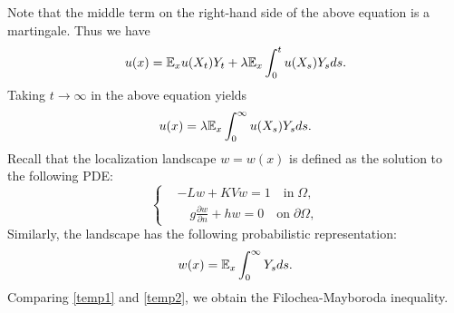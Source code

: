 \documentclass[a4paper,11pt]{article}
\begin{document}
\begin{appendices}
\begin{equation*}
\end{equation*}
Note that the middle term on the right-hand side of the above equation is a martingale. Thus we have
\begin{equation*}
u(x) = \mathbb{E}_xu(X_t)Y_t+\lambda\mathbb{E}_x\int_0^t u(X_s)Y_sds.
\end{equation*}
Taking $t\rightarrow\infty$ in the above equation yields
\begin{equation}\label{temp1}
u(x) = \lambda\mathbb{E}_x\int_0^\infty u(X_s)Y_sds.
\end{equation}
Recall that the localization landscape $w = w(x)$ is defined as the solution to the following PDE:
\begin{equation*}
\left\{
\begin{split}
& - L w + K V w = 1 \quad \textrm{in} \; \Omega, \\
& \quad g \frac{\partial w}{\partial n} + h w = 0 \quad \textrm{on} \; \partial \Omega,
\end{split}\right.
\end{equation*}
Similarly, the landscape has the following probabilistic representation:
\begin{equation}\label{temp2}
w(x) = \mathbb{E}_x\int_0^\infty Y_sds.
\end{equation}
Comparing \eqref{temp1} and \eqref{temp2}, we obtain the Filochea-Mayboroda inequality.



\end{appendices}
\end{document}

